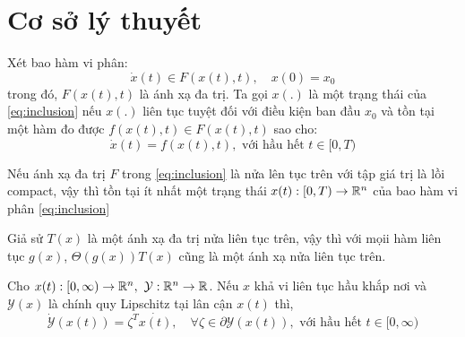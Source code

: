 \section{Cơ sở lý thuyết}

Xét bao hàm vi phân:
\begin{equation}
    \label{eq:inclusion}
    \dot x(t) \in F(x(t), t), \quad x(0) = x_0
\end{equation}
trong đó, $F(x(t), t)$ là ánh xạ đa trị. Ta gọi $x(.)$ là một trạng thái của \eqref{eq:inclusion} nếu $x(.)$ liên tục tuyệt đối với điều kiện ban đầu $x_0$ và tồn tại một hàm đo được $f(x(t), t) \in F(x(t), t)$ sao cho:
\begin{equation*}
    \dot x(t) = f(x(t), t), \text{ với hầu hết } t \in [0, T)
\end{equation*}



\begin{md}
    \label{state_existance}
    Nếu ánh xạ đa trị $F$ trong \eqref{eq:inclusion} là nửa lên tục trên với tập giá trị là lồi compact, vậy thì tồn tại ít nhất một trạng thái $x(t): [0, T) \to \mathbb{R}^n$ của bao hàm vi phân \eqref{eq:inclusion}
\end{md}
\begin{bd} 
    \label{lemma 2.2}
    Giả sử $T (x)$ là một ánh xạ đa trị nửa liên tục trên,
vậy thì với mọii hàm liên tục $g(x)$, $\Theta(g(x))T (x)$ cũng là một ánh xạ nửa liên tục trên.
\end{bd}

\begin{md}
    \label{chain_rule}
    Cho $x(t): [0, \infty) \to \mathbb{R}^n, \ \mathcal{Y}: \mathbb{R}^n \to \mathbb{R}$. Nếu $x$ khả vi liên tục hầu khắp nơi và $\mathcal{Y}(x)$ là chính quy Lipschitz tại lân cận $x(t)$ thì,
    \begin{equation*}
        \dot{\mathcal{Y}}(x(t)) = \zeta^T \dot{x(t)}, \quad \forall \zeta \in \partial \mathcal{Y}(x(t)), \text{ với hầu hết $t \in [0, \infty)$}
    \end{equation*}
\end{md}

